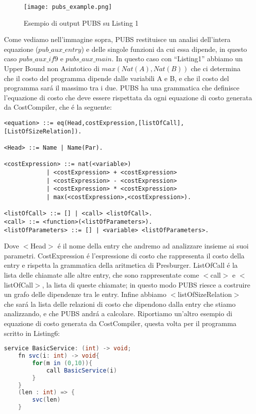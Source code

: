 \documentclass[../../main.tex]{subfiles}
\begin{document}
\begin{figure}[H]
    \centering
    \texttt{[image: pubs\_example.png]}
    \caption{Esempio di output PUBS su Listing 1}
\end{figure}
Come vediamo nell'immagine sopra, PUBS restituisce un analisi dell'intera equazione ($pub\_aux\_entry$) e delle singole funzioni da cui essa dipende, in questo caso $pubs\_aux\_if9$ e $pubs\_aux\_main$.
In questo caso con ``Listing1'' abbiamo un Upper Bound non Asintotico di $max(Nat(A), Nat(B))$ che ci determina che il costo del programma dipende dalle variabili A e B, e che il costo del programma sará il massimo tra i due.
PUBS ha una grammatica che definisce l'equazione di costo che deve essere rispettata da ogni equazione di costo generata da CostCompiler, che é la seguente:
\begin{lstlisting}[language=ANTLR, caption={Grammatica PUBS}]
<equation> ::= eq(Head,costExpression,[listOfCall],[ListOfSizeRelation]).

<Head> ::= Name | Name(Par).

<costExpression> ::= nat(<variable>) 
            | <costExpression> + <costExpression> 
            | <costExpression> - <costExpression> 
            | <costExpression> * <costExpression> 
            | max(<costExpression>,<costExpression>).
                
<listOfCall> ::= [] | <call> <listOfCall>.
<call> ::= <function>(<listOfParameters>).
<listOfParameters> ::= [] | <variable> <listOfParameters>.
\end{lstlisting}
Dove $<$Head$>$ é il nome della entry che andremo ad analizzare insieme ai suoi parametri.
CostExpression é l'espressione di costo che rappresenta il costo della entry e rispetta la grammatica della aritmetica di Presburger.
ListOfCall é la lista delle chiamate alle altre entry, che sono rappresentate come $<$call$>$ e $<$listOfCall$>$, la lista di queste chiamate; in questo modo PUBS riesce a costruire un grafo delle dipendenze tra le entry.
Infine abbiamo $<$listOfSizeRelation$>$ che sará la lista delle relazioni di costo che dipendono dalla entry che stiamo analizzando, e che PUBS andrá a calcolare.
Riportiamo un'altro esempio di equazione di costo generata da CostCompiler, questa volta per il programma scritto in Listing6:
\begin{lstlisting}[caption={Listing 6}, language=Java]
    service BasicService: (int) -> void;
    fn svc(i: int) -> void{
        for(m in (0,10)){
            call BasicService(i)
        }
    }
    (len : int) => {
        svc(len)
    }
\end{lstlisting}
\end{document}
